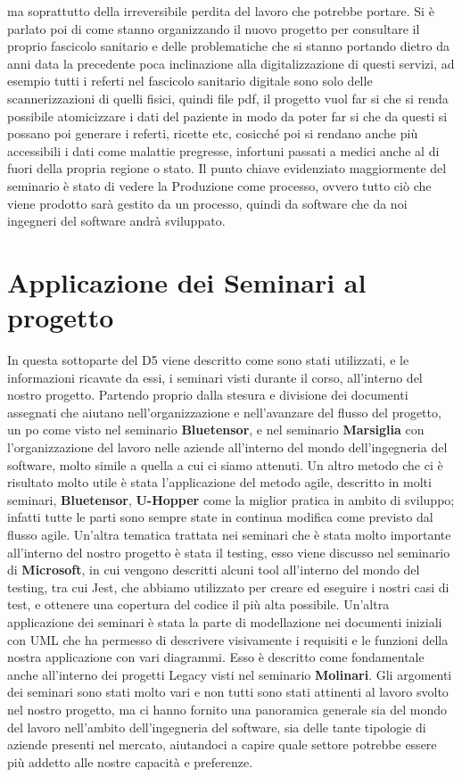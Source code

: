 \documentclass{article}
\begin{document}
ma soprattutto della irreversibile perdita del lavoro che potrebbe portare.
Si è parlato poi di come stanno organizzando il nuovo progetto per consultare il proprio
fascicolo sanitario e delle problematiche che si stanno portando dietro da anni data la
precedente poca inclinazione alla digitalizzazione di questi servizi, ad esempio tutti i referti nel
fascicolo sanitario digitale sono solo delle scannerizzazioni di quelli fisici, quindi file pdf, il
progetto vuol far si che si renda possibile atomicizzare i dati del paziente in modo da poter far si
che da questi si possano poi generare i referti, ricette etc,  cosicché poi si rendano anche più
accessibili i dati come malattie pregresse, infortuni passati a medici anche al di fuori della
propria regione o stato.
Il punto chiave evidenziato maggiormente del seminario è stato di vedere la Produzione come processo, ovvero tutto ciò che viene prodotto sarà gestito da un processo, quindi da
software che da noi  ingegneri del software andrà sviluppato.

\section{Applicazione dei Seminari al progetto}
In questa sottoparte del D5 viene descritto come sono stati utilizzati, e le informazioni ricavate da essi, i seminari visti durante il corso, all'interno del nostro progetto.
Partendo proprio dalla stesura e divisione dei documenti assegnati che aiutano nell'organizzazione e nell'avanzare del flusso del progetto, un po come visto nel seminario \textbf{Bluetensor}, e nel seminario \textbf{Marsiglia} con l'organizzazione del lavoro nelle aziende all'interno del mondo dell'ingegneria del software, molto simile a quella a cui ci siamo attenuti.
Un altro metodo che ci è risultato molto utile è stata l'applicazione del metodo agile, descritto in molti seminari, \textbf{Bluetensor}, \textbf{U-Hopper} come la miglior pratica in ambito di sviluppo; infatti tutte le parti sono sempre state in continua modifica come previsto dal flusso agile.
Un'altra tematica trattata nei seminari che è stata molto importante all'interno del nostro progetto è stata il testing, esso viene discusso nel seminario di \textbf{Microsoft}, in cui vengono descritti alcuni tool all'interno del mondo del testing, tra cui Jest, che abbiamo utilizzato per creare ed eseguire i nostri casi di test, e ottenere una copertura del codice il più alta possibile.
Un'altra applicazione dei seminari è stata la parte di modellazione nei documenti iniziali con UML che ha permesso di descrivere visivamente i requisiti e le funzioni della nostra applicazione con vari diagrammi. Esso è descritto come fondamentale anche all'interno dei progetti Legacy visti nel seminario \textbf{Molinari}. 
Gli argomenti dei seminari sono stati molto vari e non tutti sono stati attinenti al lavoro svolto nel nostro progetto, ma ci hanno fornito una panoramica generale sia del mondo del lavoro nell'ambito dell'ingegneria del software, sia delle tante tipologie di aziende presenti nel mercato, aiutandoci a capire quale settore potrebbe essere più addetto alle nostre capacità e preferenze.
\end{document}
